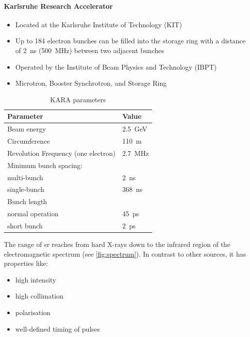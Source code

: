 \paragraph{Karlsruhe Research Accelerator}
\begin{itemize}[noitemsep]
	\item Located at the Karlsruhe Institute of Technology (KIT)
	\item Up to 184 electron bunches can be filled into the storage ring with a distance of \SI{2}{\nano\second} (\SI{500}{\mega\hertz}) between two adjacent bunches
	\item Operated by the Institute of Beam Physics and Technology (IBPT)
	\item Microtron, Booster Synchrotron, and Storage Ring
\end{itemize}

\begin{table}[tbh]
	\caption{KARA parameters \cite{rota2018}}
	\label{tab:kara}
	\centering
	\begin{tabularx}{0.7\textwidth}{Xl}
		\toprule
		\textbf{Parameter} & \textbf{Value} \\
		\midrule
		Beam energy    							&  \SI{2.5}{\giga \electronvolt} \\
		Circumference 	 						& \SI{110}{\meter}	  \\
		Revolution Frequency (one electron)   	& \SI{2.7}{\mega \hertz} 	\\
		Minimum bunch spacing:					& 	\\
		\quad multi-bunch 						& \SI{2}{\nano \second} \\
		\quad single-bunch 						& \SI{368}{\nano \second}	\\
		Bunch length							& \\
		\quad normal operation					& \SI{45}{\pico \second} \\
		\quad short bunch						& \SI{2}{\pico \second} \\
		\bottomrule		
	\end{tabularx}
\end{table}

The range of \gls{sr} reaches from hard X-rays down to the infrared region of the electromagnetic spectrum (see \autoref{fig:spectrum}). In contrast to other sources, it has properties like:
\begin{itemize}[noitemsep]
	\item high intensity 
	\item high collimation
	\item polarisation
	\item well-defined timing of pulses
\end{itemize}

